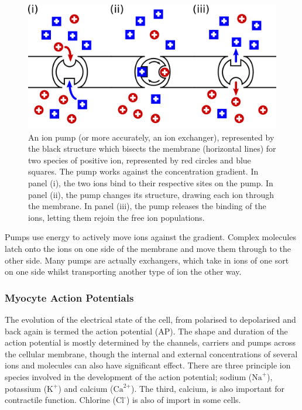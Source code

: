 \begin{figure}
\begin{center}
\includegraphics{figures/intro/ion_pump}
\end{center}
\caption[Ion Pump]{
\label{fig:intro:heart:ion_pump}
An ion pump (or more accurately, an ion exchanger), represented by the black
structure which bisects the membrane (horizontal lines) for two species of
positive ion, represented by red circles and blue squares.
The pump works against the concentration gradient.
In panel (i), the two ions bind to their respective sites on the pump.
In panel (ii), the pump changes its structure, drawing each ion through the
membrane.
In panel (iii), the pump releases the binding of the ions, letting them rejoin
the free ion populations.
}
\end{figure}

Pumps use energy to actively move ions against the gradient.
Complex molecules latch onto the ions on one side of the membrane and move them
through to the other side.
Many pumps are actually exchangers, which take in ions of one sort on one side
whilst transporting another type of ion the other way.

\subsubsection{Myocyte Action Potentials}

The evolution of the electrical state of the cell, from polarised to depolarised
and back again is termed the action potential (AP).
The shape and duration of
the action potential is mostly determined by the channels, carriers and pumps
across the cellular membrane, though the internal and external concentrations of
several ions and molecules can also have significant effect.
There are three
principle ion species involved in the development of the action potential;
sodium ($\text{Na}^{\text{+}}$), potassium ($\text{K}^{\text{+}}$) and calcium
($\text{Ca}^{\text{2+}}$).
The third, calcium, is also important for contractile function.
Chlorine ($\text{Cl}^{\text{-}}$) is also of import in some cells.

